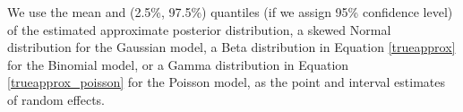 \documentclass[article]{jss}
\begin{document}

We use the  mean and (2.5\%, 97.5\%) quantiles (if we assign 95\% confidence level) of the estimated approximate posterior distribution, a skewed Normal distribution for the Gaussian model, a Beta distribution in Equation \ref{trueapprox} for the Binomial model, or a Gamma distribution in Equation \ref{trueapprox_poisson} for the Poisson model, as the point and interval estimates of  random effects.










\end{document}
